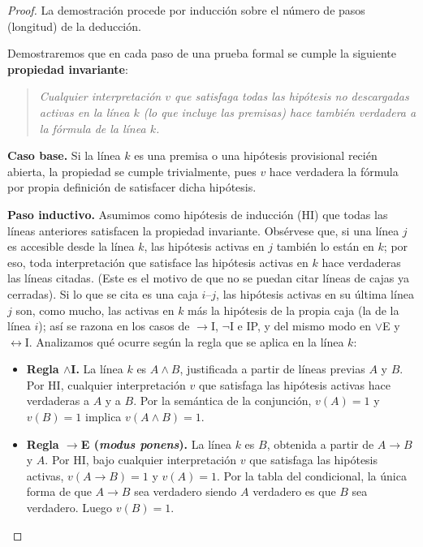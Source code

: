 \begin{proof}
La demostración procede por inducción sobre el número de pasos (longitud) de la deducción. 

Demostraremos que en cada paso de una prueba formal se cumple la siguiente \textbf{propiedad invariante}:
\begin{quote}
\textit{Cualquier interpretación $v$ que satisfaga todas las hipótesis no descargadas activas en la línea $k$ (lo que incluye las premisas) hace también verdadera a la fórmula de la línea $k$.}
\end{quote}

\textbf{Caso base.} Si la línea $k$ es una premisa o una hipótesis provisional recién abierta, la propiedad se cumple trivialmente, pues $v$ hace verdadera la fórmula por propia definición de satisfacer dicha hipótesis.

\textbf{Paso inductivo.} Asumimos como hipótesis de inducción (HI) que
todas las líneas anteriores satisfacen la propiedad
invariante. Obsérvese que, si una línea $j$ es accesible desde la
línea $k$, las hipótesis activas en $j$ también lo están en $k$; por
eso, toda interpretación que satisface las hipótesis activas en $k$
hace verdaderas las líneas citadas. (Este es el motivo de que no se
puedan citar líneas de cajas ya cerradas). Si lo que se cita es una
caja $i$--$j$, las hipótesis activas en su última línea $j$ son, como
mucho, las activas en $k$ más la hipótesis de la propia caja (la de la
línea $i$); así se razona en los casos de $\to$I, $\neg$I e IP, y del
mismo modo en $\lor$E y $\leftrightarrow$I. Analizamos qué ocurre según
la regla que se aplica en la línea $k$:

\begin{itemize}
    \item \textbf{Regla $\land$I.} La línea $k$ es $A \land B$, justificada a partir de líneas previas $A$ y $B$. Por HI, cualquier interpretación $v$ que satisfaga las hipótesis activas hace verdaderas a $A$ y a $B$. Por la semántica de la conjunción, $v(A) = 1$ y $v(B) = 1$ implica $v(A \land B) = 1$.
    
    \item \textbf{Regla $\to$E (\emph{modus ponens}).} La línea $k$ es
      $B$, obtenida a partir de $A \to B$ y $A$. Por HI, bajo
      cualquier interpretación $v$ que satisfaga las hipótesis activas, $v(A \to B) = 1$ y $v(A) = 1$. Por la tabla del condicional, la única forma de que $A \to B$ sea verdadero siendo $A$ verdadero es que $B$ sea verdadero. Luego $v(B) = 1$.


\end{itemize}
\end{proof}
